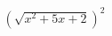 \documentclass[preview]{standalone}
\begin{document}
\begin{align*}
(\sqrt{x^2 + 5x + 2})^2
\end{align*}
\end{document}
